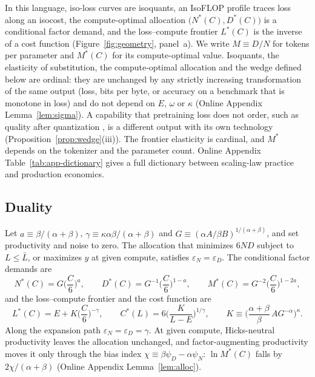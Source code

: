 In this language, iso-loss curves are isoquants, an IsoFLOP profile traces loss along an isocost, the compute-optimal
allocation $\big(N^*(C),D^*(C)\big)$ is a conditional factor demand, and the loss--compute frontier $L^*(C)$ is the
inverse of a cost function (Figure~\ref{fig:geometry}, panel~a). We write $M\equiv D/N$ for tokens per parameter and
$M^*(C)$ for its compute-optimal value. Isoquants, the elasticity of substitution, the compute-optimal allocation and the
wedge defined below are ordinal: they are unchanged by any strictly increasing transformation of the same output (loss,
bits per byte, or accuracy on a benchmark that is monotone in loss) and do not depend on $E$, $\omega$ or $\kappa$
(Online Appendix Lemma~\ref{lem:sigma}). A capability that pretraining loss does not order, such as quality after
quantization \citep{kumar2024scaling}, is a different output with its own technology (Proposition~\ref{prop:wedge}(iii)). The frontier
elasticity is cardinal, and $M^*$ depends on the tokenizer and the parameter count. Online Appendix
Table~\ref{tab:app-dictionary} gives a full dictionary between scaling-law practice and production economics.

\subsection{Duality}\label{sec:framework:duality}

Let $a\equiv\beta/(\alpha+\beta)$, $\gamma\equiv\kappa\alpha\beta/(\alpha+\beta)$ and
$G\equiv(\alpha A/\beta B)^{1/(\alpha+\beta)}$, and set productivity and noise to zero. The allocation that minimizes
$6ND$ subject to $L\le\bar L$, or maximizes $y$ at given compute, satisfies $\varepsilon_N=\varepsilon_D$. The conditional
factor demands are
\begin{equation}\label{eq:demands}
N^*(C)=G\Big(\frac C6\Big)^{a},\qquad D^*(C)=G^{-1}\Big(\frac C6\Big)^{1-a},\qquad M^*(C)=G^{-2}\Big(\frac C6\Big)^{1-2a},
\end{equation}
and the loss--compute frontier and the cost function are
\begin{equation}\label{eq:frontier}
L^*(C)=E+K\Big(\frac C6\Big)^{-\gamma},\qquad C^*(L)=6\Big(\frac{K}{L-E}\Big)^{1/\gamma},
\qquad K\equiv\Big(\frac{\alpha+\beta}{\beta}\,AG^{-\alpha}\Big)^{\kappa}.
\end{equation}
Along the expansion path $\varepsilon_N=\varepsilon_D=\gamma$. At given compute, Hicks-neutral productivity leaves the
allocation unchanged, and factor-augmenting productivity moves it only through the bias index
$\chi\equiv\beta\psi_D-\alpha\psi_N$: $\ln M^*(C)$ falls by $2\chi/(\alpha+\beta)$ (Online Appendix
Lemma~\ref{lem:alloc}).

